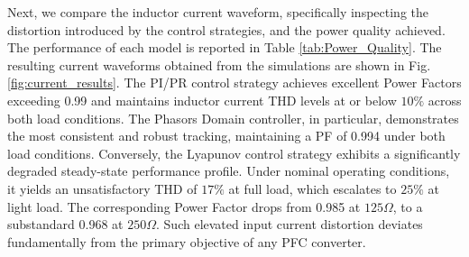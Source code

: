 \documentclass[DIV=calc, paper=a4, fontsize=11pt, twocolumn]{scrartcl}	 %
\begin{document}
\begin{table}[htp]
    \centering
    \caption{Settling Time, Voltage Overshoot vs. Inner Gain $K_c$}
    \label{tab:Lyapunov_Transient}
\end{table}
Next, we compare the inductor current waveform, specifically inspecting the distortion introduced by the control strategies, and the power quality achieved. The performance of each model is reported in Table \ref{tab:Power_Quality}. 
The resulting current waveforms obtained from the simulations are shown in Fig. \ref{fig:current_results}. 
The PI/PR control strategy achieves excellent Power Factors exceeding 0.99 and maintains inductor current THD levels at or below $10\%$ across both load conditions. The Phasors Domain controller, in particular, demonstrates the most consistent and robust tracking, maintaining a PF of 0.994 under both load conditions. Conversely, the Lyapunov control strategy exhibits a significantly degraded steady-state performance profile. Under nominal operating conditions, it yields an unsatisfactory THD of $17\%$ at full load, which escalates to $25\%$ at light load. The corresponding Power Factor drops from 0.985 at $125 \Omega$, to a substandard 0.968 at $250 \Omega$. Such elevated input current distortion deviates fundamentally from the primary objective of any PFC converter. 
\end{document}

